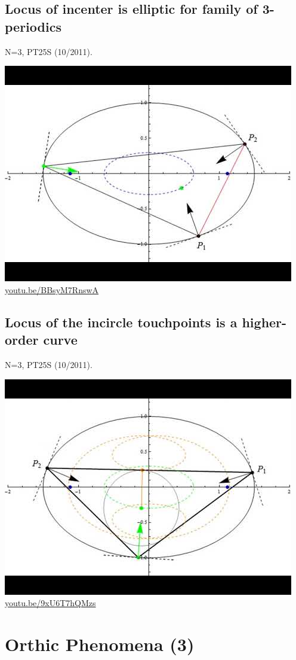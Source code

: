 \documentclass[12pt]{amsart}
\begin{document}
\subsection{Locus of incenter is elliptic for family of 3-periodics}
\label{vid:BBsyM7RnswA}
\noindent N=3, PT25S (10/2011). 
\begin{center}\includegraphics[width=.5\textwidth]{pics/BBsyM7RnswA.jpg} \\ 
\href{https://youtu.be/BBsyM7RnswA}{\url{youtu.be/BBsyM7RnswA}}\end{center}
% 

\subsection{Locus of the incircle touchpoints is a higher-order curve}
\label{vid:9xU6T7hQMzs}
\noindent N=3, PT25S (10/2011). 
\begin{center}\includegraphics[width=.5\textwidth]{pics/9xU6T7hQMzs.jpg} \\ 
\href{https://youtu.be/9xU6T7hQMzs}{\url{youtu.be/9xU6T7hQMzs}}\end{center}
% 


\section{Orthic Phenomena (3)}
\end{document}
